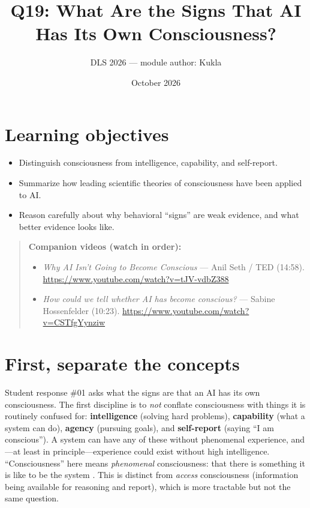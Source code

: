 \documentclass[11pt]{article}
\title{Q19: What Are the Signs That AI Has Its Own Consciousness?}
\author{DLS 2026 --- module author: Kukla}
\date{October 2026}
\begin{document}
\maketitle

\section*{Learning objectives}
\begin{itemize}[leftmargin=1.4em]
\item Distinguish consciousness from intelligence, capability, and self-report.
\item Summarize how leading scientific theories of consciousness have been applied to AI.
\item Reason carefully about why behavioral ``signs'' are weak evidence, and what better evidence looks like.
\end{itemize}

\begin{quote}\small\textbf{Companion videos (watch in order):}\begin{itemize}\setlength\itemsep{0pt}\item \emph{Why AI Isn't Going to Become Conscious} --- Anil Seth / TED (14:58). \url{https://www.youtube.com/watch?v=tJV-vdbZ388}\item \emph{How could we tell whether AI has become conscious?} --- Sabine Hossenfelder (10:23). \url{https://www.youtube.com/watch?v=CSTfgYynziw}\end{itemize}\end{quote}

\section{First, separate the concepts}
Student response \#01 asks what the signs are that an AI has its own consciousness. The first discipline
is to \emph{not} conflate consciousness with things it is routinely confused for: \textbf{intelligence}
(solving hard problems), \textbf{capability} (what a system can do), \textbf{agency} (pursuing goals),
and \textbf{self-report} (saying ``I am conscious''). A system can have any of these without
phenomenal experience, and---at least in principle---experience could exist without high intelligence.
``Consciousness'' here means \emph{phenomenal} consciousness: that there is something it is like to be
the system \citep{nagel1974bat}. This is distinct from \emph{access} consciousness (information being
available for reasoning and report), which is more tractable but not the same question.
\end{document}
